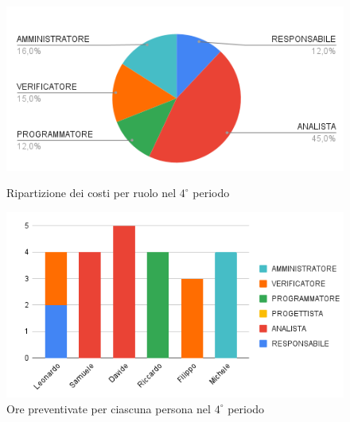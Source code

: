 \begin{figure}[H]
  \centering
  \includegraphics[width=0.6\linewidth]{grafici/4_periodo_torta.png}
  \caption{Ripartizione dei costi per ruolo nel $4^\circ$ periodo}
        \vspace{10mm}
  \includegraphics[width=0.7\linewidth]{grafici/4_periodo_istogramma.png}
  \caption{Ore preventivate per ciascuna persona nel $4^\circ$ periodo}
\end{figure}


